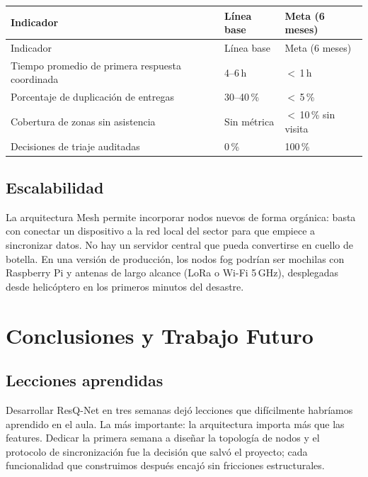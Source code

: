 \documentclass[12pt,a4paper]{article}
\begin{document}
\begin{longtable}{p{5.5cm} p{3cm} p{4cm}}
  \toprule
  Indicador & Línea base & Meta (6 meses) \\
  \midrule
  \endfirsthead
  \toprule
  Indicador & Línea base & Meta (6 meses) \\
  \midrule
  \endhead
  Tiempo promedio de primera respuesta coordinada & 4--6\,h & $<$\,1\,h \\
  Porcentaje de duplicación de entregas & 30--40\,\% & $<$\,5\,\% \\
  Cobertura de zonas sin asistencia & Sin métrica & $<$\,10\,\% sin visita \\
  Decisiones de triaje auditadas & 0\,\% & 100\,\% \\
  \bottomrule
\end{longtable}

\subsection{Escalabilidad}

La arquitectura Mesh permite incorporar nodos nuevos de forma orgánica:
basta con conectar un dispositivo a la red local del sector para que empiece
a sincronizar datos. No hay un servidor central que pueda convertirse en
cuello de botella. En una versión de producción, los nodos fog podrían ser
mochilas con Raspberry Pi y antenas de largo alcance (LoRa o Wi-Fi 5\,GHz),
desplegadas desde helicóptero en los primeros minutos del desastre.

\section{Conclusiones y Trabajo Futuro}

\subsection{Lecciones aprendidas}

Desarrollar ResQ-Net en tres semanas dejó lecciones que difícilmente habríamos
aprendido en el aula. La más importante: la arquitectura importa más que las
features. Dedicar la primera semana a diseñar la topología de nodos y el
protocolo de sincronización fue la decisión que salvó el proyecto; cada
funcionalidad que construimos después encajó sin fricciones estructurales.
\end{document}
